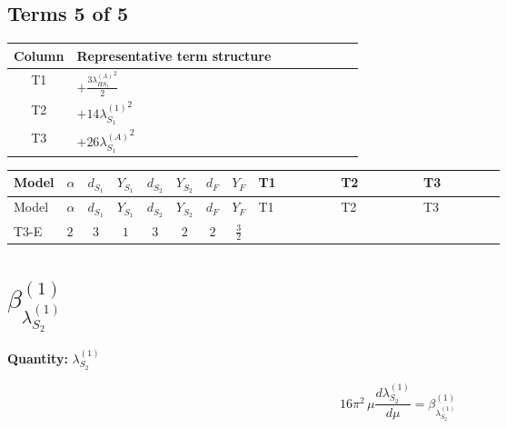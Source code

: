 \documentclass[8pt]{article}
\begin{document}
\begin{landscape}
\subsection*{Terms 5 of 5}
\begin{center}
\begin{tabular}{@{}c >{\raggedright\arraybackslash}p{0.82\linewidth}@{}}
\toprule
Column & Representative term structure \\
\midrule
T1 & \(\displaystyle +\frac{3 {\lambda_{HS_1}^{(A)}}^2}{2}\) \\
\midrule
T2 & \(\displaystyle +14 {\lambda_{S_1}^{(1)}}^2\) \\
\midrule
T3 & \(\displaystyle +26 {\lambda_{S_1}^{(A)}}^2\) \\
\midrule
\bottomrule
\end{tabular}
\end{center}
\smallskip
\tiny
\begin{longtable}{@{}llcccccc >{\raggedright\arraybackslash}p{0.21\linewidth} >{\raggedright\arraybackslash}p{0.21\linewidth} >{\raggedright\arraybackslash}p{0.21\linewidth}@{}}
\toprule
Model & $\alpha$ & $d_{S_1}$ & $Y_{S_1}$ & $d_{S_2}$ & $Y_{S_2}$ & $d_F$ & $Y_F$ & T1 & T2 & T3 \\
\midrule
\endfirsthead
\toprule
Model & $\alpha$ & $d_{S_1}$ & $Y_{S_1}$ & $d_{S_2}$ & $Y_{S_2}$ & $d_F$ & $Y_F$ & T1 & T2 & T3 \\
\midrule
\endhead
T3-E & $2$ & $3$ & $1$ & $3$ & $2$ & $2$ & $\frac{3}{2}$ & \scriptsize\adjustbox{max width=\linewidth}{$\begin{gathered} +\frac{3 {\lambda_{HS_1}^{(A)}}^2}{2}\end{gathered}$} & \scriptsize\adjustbox{max width=\linewidth}{$\begin{gathered} +14 {\lambda_{S_1}^{(1)}}^2\end{gathered}$} & \scriptsize\adjustbox{max width=\linewidth}{$\begin{gathered} +26 {\lambda_{S_1}^{(A)}}^2\end{gathered}$} \\
\midrule
\bottomrule
\end{longtable}
\clearpage
\section*{$\beta_{\lambda_{S_2}^{(1)}}^{(1)}$}
\noindent\textbf{Quantity: }$\lambda_{S_2}^{(1)}$\par\smallskip
\[16\pi^2\,\mu\frac{d \lambda_{S_2}^{(1)}}{d\mu}=\beta_{\lambda_{S_2}^{(1)}}^{(1)}\]

\end{landscape}
\end{document}
